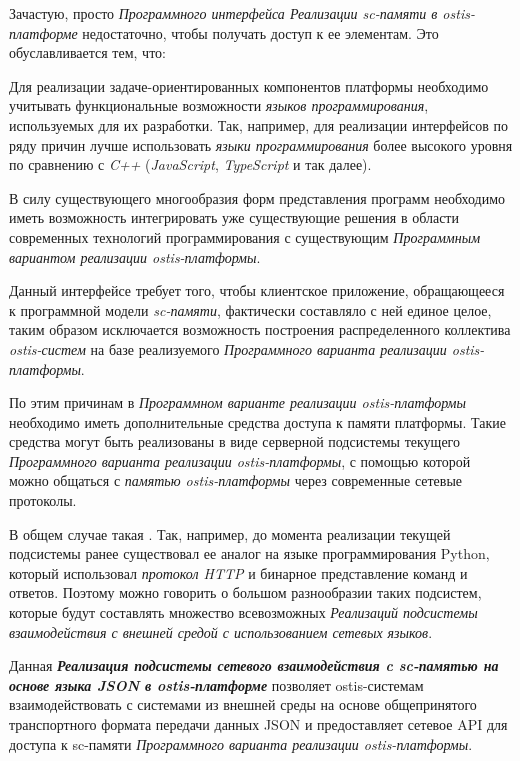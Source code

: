 Зачастую, просто \textit{Программного интерфейса Реализации sc-памяти в ostis-платформе} недостаточно, чтобы получать доступ к ее элементам. Это обуславливается тем, что:
\begin{textitemize}
	\item Для реализации задаче-ориентированных компонентов платформы необходимо учитывать функциональные возможности \textit{языков программирования}, используемых для их разработки. Так, например, для реализации интерфейсов по ряду причин лучше использовать \textit{языки программирования} более высокого уровня по сравнению с \textit{C++} (\textit{JavaScript}, \textit{TypeScript} и так далее).
	\item В силу существующего многообразия форм представления программ необходимо иметь возможность интегрировать уже существующие решения в области современных технологий программирования с существующим \textit{Программным вариантом реализации ostis-платформы}.
	\item Данный интерфейсе требует того, чтобы клиентское приложение, обращающееся к программной модели \textit{sc-памяти}, фактически составляло с ней единое целое, таким образом исключается возможность построения распределенного коллектива \textit{ostis-систем} на базе реализуемого \textit{Программного варианта реализации ostis-платформы}.
\end{textitemize}

По этим причинам в \textit{Программном варианте реализации ostis-платформы} необходимо иметь дополнительные средства доступа к памяти платформы. Такие средства могут быть реализованы в виде серверной подсистемы текущего \textit{Программного варианта реализации ostis-платформы}, с помощью которой можно общаться с \textit{памятью ostis-платформы} через современные сетевые протоколы.

В общем случае такая . Так, например, до момента реализации текущей подсистемы ранее существовал ее аналог на языке программирования Python, который использовал \textit{протокол HTTP} и бинарное представление команд и ответов.
Поэтому можно говорить о большом разнообразии таких подсистем, которые будут составлять множество всевозможных \textit{Реализаций подсистемы взаимодействия с внешней средой с использованием сетевых языков}.

Данная \textbf{\textit{Реализация подсистемы сетевого взаимодействия c sc-памятью на основе языка JSON в ostis-платформе}} позволяет ostis-системам взаимодействовать с системами из внешней среды на основе общепринятого транспортного формата передачи данных JSON и предоставляет сетевое API для доступа к sc-памяти \textit{Программного варианта реализации ostis-платформы}.

